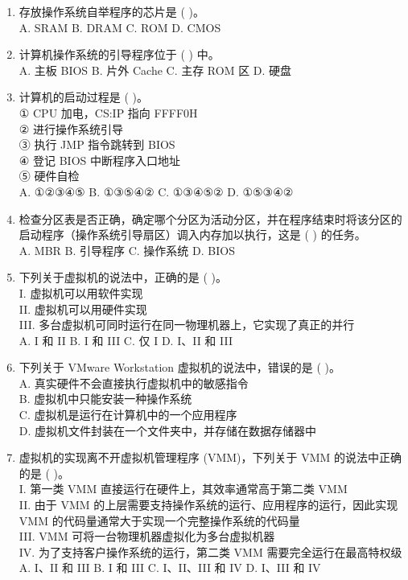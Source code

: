 \documentclass[lang=cn,newtx,10pt,scheme=chinese]{../../elegantbook}
\begin{document}
\begin{enumerate}
    \item 存放操作系统自举程序的芯片是 (    )。\\
    A. SRAM \quad B. DRAM \quad C. ROM \quad D. CMOS

    \item 计算机操作系统的引导程序位于 (    ) 中。\\
    A. 主板 BIOS \quad B. 片外 Cache \quad C. 主存 ROM 区 \quad D. 硬盘

    \item 计算机的启动过程是 (    )。\\
    ① CPU 加电，CS:IP 指向 FFFF0H\\
    ② 进行操作系统引导\\
    ③ 执行 JMP 指令跳转到 BIOS\\
    ④ 登记 BIOS 中断程序入口地址\\
    ⑤ 硬件自检\\
    A. ①②③④⑤ \quad B. ①③⑤④② \quad C. ①③④⑤② \quad D. ①⑤③④②

    \item 检查分区表是否正确，确定哪个分区为活动分区，并在程序结束时将该分区的启动程序（操作系统引导扇区）调入内存加以执行，这是 (    ) 的任务。\\
    A. MBR \quad B. 引导程序 \quad C. 操作系统 \quad D. BIOS

    \item 下列关于虚拟机的说法中，正确的是 (    )。\\
    I. 虚拟机可以用软件实现\\
    II. 虚拟机可以用硬件实现\\
    III. 多台虚拟机可同时运行在同一物理机器上，它实现了真正的并行\\
    A. I 和 II \quad B. I 和 III \quad C. 仅 I \quad D. I、II 和 III

    \item 下列关于 VMware Workstation 虚拟机的说法中，错误的是 (    )。\\
    A. 真实硬件不会直接执行虚拟机中的敏感指令\\
    B. 虚拟机中只能安装一种操作系统\\
    C. 虚拟机是运行在计算机中的一个应用程序\\
    D. 虚拟机文件封装在一个文件夹中，并存储在数据存储器中

    \item 虚拟机的实现离不开虚拟机管理程序 (VMM)，下列关于 VMM 的说法中正确的是 (    )。\\
    I. 第一类 VMM 直接运行在硬件上，其效率通常高于第二类 VMM\\
    II. 由于 VMM 的上层需要支持操作系统的运行、应用程序的运行，因此实现 VMM 的代码量通常大于实现一个完整操作系统的代码量\\
    III. VMM 可将一台物理机器虚拟化为多台虚拟机器\\
    IV. 为了支持客户操作系统的运行，第二类 VMM 需要完全运行在最高特权级\\
    A. I、II 和 III \quad B. I 和 III \quad C. I、II、III 和 IV \quad D. I、III 和 IV


\end{enumerate}
\end{document}
